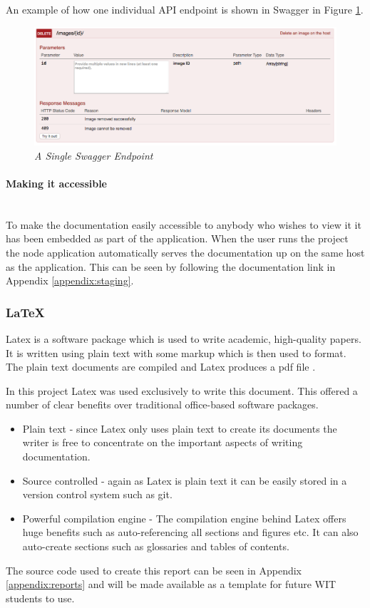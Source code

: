 An example of how one individual API endpoint is shown in Swagger in Figure \ref{fig:swagger-individual}.
\clearpage

\begin{figure}[!ht]
\centering
\includegraphics*[width=\textwidth]{images/swagger-individual}
\caption{\em A Single Swagger Endpoint}
\label{fig:swagger-individual}
\end{figure}

\paragraph{Making it accessible}\mbox{}\\
To make the documentation easily accessible to anybody who wishes to view it it has been embedded as part of the application. When the user runs the project the node application automatically serves the documentation up on the same host as the application. This can be seen by following the documentation link in Appendix \ref{appendix:staging}.

\subsubsection{LaTeX}
Latex is a software package which is used to write academic, high-quality papers. It is written using plain text with some markup which is then used to format. The plain text documents are compiled and Latex produces a pdf file \citep{Latex2017}.

In this project Latex was used exclusively to write this document. This offered a number of clear benefits over traditional office-based software packages.

\begin{itemize}
	\item Plain text - since Latex only uses plain text to create its documents the writer is free to concentrate on the important aspects of writing documentation.
	\item Source controlled - again as Latex is plain text it can be easily stored in a version control system such as \gls{git}.
	\item Powerful compilation engine - The compilation engine behind Latex offers huge benefits such as auto-referencing all sections and figures etc. It can also auto-create sections such as glossaries and tables of contents.
\end{itemize}

The source code used to create this report can be seen in Appendix \ref{appendix:reports} and will be made available as a template for future WIT students to use.
